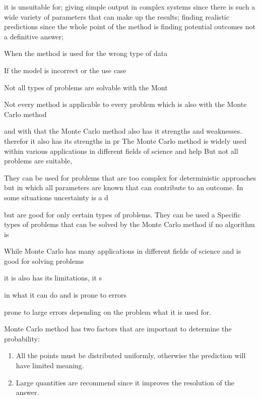 it is unsuitable for; giving simple output in complex systems since there is such a wide variety of parameters that can make up the results; finding realistic predictions since the whole point of the method is finding potential outcomes not a definitive answer;

When the method is used for the wrong type of data

If the model is incorrect or the use case 

Not all types of problems are solvable with the Mont

Not every method is applicable to every problem which is also with the Monte Carlo method 


and with that the Monte Carlo method also has it strengths and weaknesses.  therefor it also has its strengths in pr
The Monte Carlo method is widely used within various applications in different fields of science and help But not all problems are suitable, 


They can be used for problems that are too complex for deterministic approaches but in which all parameters are known that can contribute to an outcome. In some situations uncertainty is a d

 but are good for only certain types of problems. They can be used a 
Specific types of problems that can be solved by the Monte Carlo method if no algorithm is

While Monte Carlo has many applications in different fields of science and is good for solving problems

 it is also has its limitations, it s

 in what it can do and is prone to errors

prone to large errors depending on the problem what it is used for. 



\label{subsec:Monte_Carlo_Pitfalls}


Monte Carlo method has two factors that are important to determine the probability:
\begin{enumerate}[1:]
	\item All the points must be distributed uniformly, otherwise the prediction will have limited meaning.
	\item Large quantities are recommend since it improves the resolution of the answer.
\end{enumerate}
